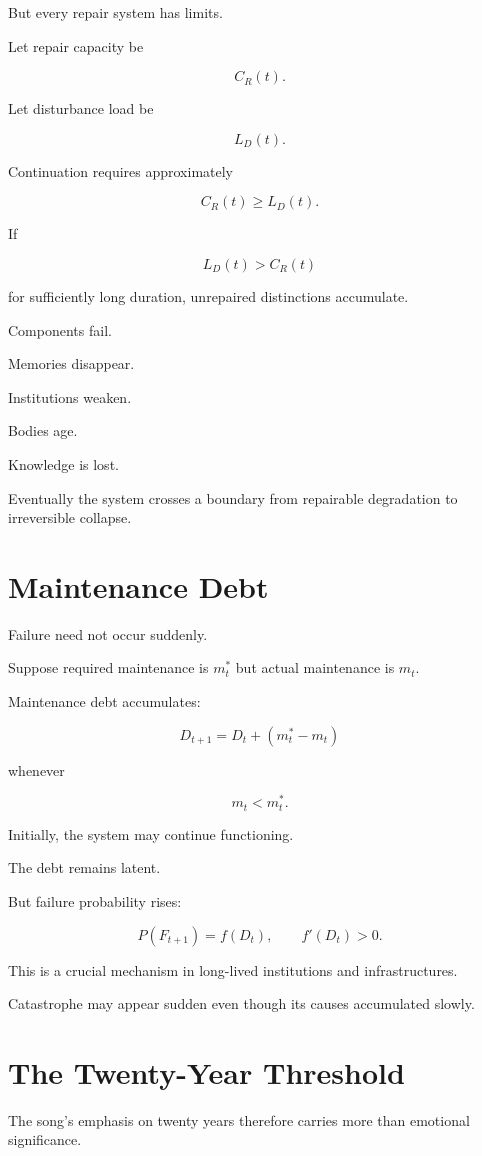 \documentclass[11pt,oneside]{book}
\theoremstyle{definition}
\theoremstyle{remark}
\begin{document}
But every repair system has limits.

Let repair capacity be

\[
C_R(t).
\]

Let disturbance load be

\[
L_D(t).
\]

Continuation requires approximately

\[
C_R(t)\geq L_D(t).
\]

If

\[
L_D(t)>C_R(t)
\]

for sufficiently long duration, unrepaired distinctions accumulate.

Components fail.

Memories disappear.

Institutions weaken.

Bodies age.

Knowledge is lost.

Eventually the system crosses a boundary from repairable degradation to irreversible collapse.

\section{Maintenance Debt}

Failure need not occur suddenly.

Suppose required maintenance is \(m^\ast_t\) but actual maintenance is \(m_t\).

Maintenance debt accumulates:

\[
D_{t+1}
=
D_t+
(m^\ast_t-m_t)
\]

whenever

\[
m_t<m^\ast_t.
\]

Initially, the system may continue functioning.

The debt remains latent.

But failure probability rises:

\[
P(F_{t+1})
=
f(D_t),
\qquad
f'(D_t)>0.
\]

This is a crucial mechanism in long-lived institutions and infrastructures.

Catastrophe may appear sudden even though its causes accumulated slowly.

\section{The Twenty-Year Threshold}

The song's emphasis on twenty years therefore carries more than emotional significance.
\end{document}

